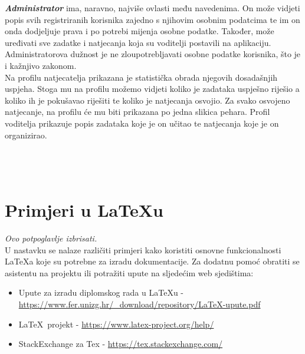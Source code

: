 	    \textbf{\textit{Administrator}} ima, naravno, najviše ovlasti među navedenima. On može vidjeti popis svih registriranih korisnika zajedno s njihovim osobnim podatcima te im on onda dodjeljuje prava i po potrebi mijenja osobne podatke. Također, može uređivati sve zadatke i natjecanja koja su voditelji postavili na aplikaciju. Administratorova dužnost je ne zloupotrebljavati osobne podatke korisnika, što je i kažnjivo zakonom.\\
	    
	    Na profilu natjecatelja prikazana je statistička obrada njegovih dosadašnjih uspjeha. Stoga mu na profilu možemo vidjeti koliko je zadataka uspješno riješio a koliko ih je pokušavao riješiti te koliko je natjecanja osvojio. Za svako osvojeno natjecanje, na profilu će mu biti prikazana po jedna slikica pehara.
	    Profil voditelja prikazuje popis zadataka koje je on učitao te natjecanja koje je on organizirao. \\
	
		\\
		
		\\
		
		\\
		\eject
		
		
		
		\section{Primjeri u \LaTeX u}
		
		\textit{Ovo potpoglavlje izbrisati.}\\

		U nastavku se nalaze različiti primjeri kako koristiti osnovne funkcionalnosti \LaTeX a koje su potrebne za izradu dokumentacije. Za dodatnu pomoć obratiti se asistentu na projektu ili potražiti upute na sljedećim web sjedištima:
		\begin{itemize}
			\item Upute za izradu diplomskog rada u \LaTeX u - \url{https://www.fer.unizg.hr/_download/repository/LaTeX-upute.pdf}
			\item \LaTeX\ projekt - \url{https://www.latex-project.org/help/}
			\item StackExchange za Tex - \url{https://tex.stackexchange.com/}\\
		
		\end{itemize} 	


